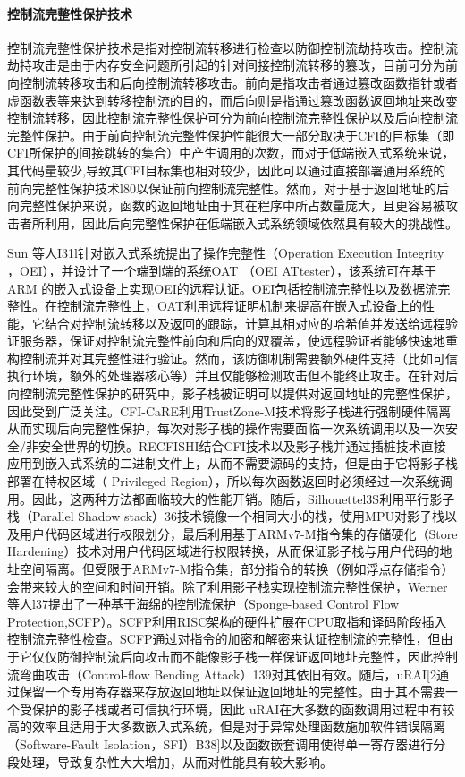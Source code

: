 \documentclass[12pt,a4paper]{ctexart}
\begin{document}
\paragraph{控制流完整性保护技术}
\par 控制流完整性保护技术是指对控制流转移进行检查以防御控制流劫持攻击。控制流劫持攻击是由于内存安全问题所引起的针对间接控制流转移的篡改，目前可分为前向控制流转移攻击和后向控制流转移攻击。前向是指攻击者通过篡改函数指针或者虚函数表等来达到转移控制流的目的，而后向则是指通过篡改函数返回地址来改变控制流转移，因此控制流完整性保护可分为前向控制流完整性保护以及后向控制流完整性保护。由于前向控制流完整性保护性能很大一部分取决于CFI的目标集（即CFI所保护的间接跳转的集合）中产生调用的次数，而对于低端嵌入式系统来说，其代码量较少,导致其CFI目标集也相对较少，因此可以通过直接部署通用系统的前向完整性保护技术l80以保证前向控制流完整性。然而，对于基于返回地址的后向完整性保护来说，函数的返回地址由于其在程序中所占数量庞大，且更容易被攻击者所利用，因此后向完整性保护在低端嵌入式系统领域依然具有较大的挑战性。
\par Sun 等人I31l针对嵌入式系统提出了操作完整性（Operation Execution Integrity ，OEI），并设计了一个端到端的系统OAT （OEI ATtester），该系统可在基于ARM 的嵌入式设备上实现OEI的远程认证。OEI包括控制流完整性以及数据流完整性。在控制流完整性上，OAT利用远程证明机制来提高在嵌入式设备上的性能，它结合对控制流转移以及返回的跟踪，计算其相对应的哈希值并发送给远程验证服务器，保证对控制流完整性前向和后向的双覆盖，使远程验证者能够快速地重构控制流并对其完整性进行验证。然而，该防御机制需要额外硬件支持（比如可信执行环境，额外的处理器核心等）并且仅能够检测攻击但不能终止攻击。在针对后向控制流完整性保护的研究中，影子栈被证明可以提供对返回地址的完整性保护，因此受到广泛关注。CFI-CaRE利用TrustZone-M技术将影子栈进行强制硬件隔离从而实现后向完整性保护，每次对影子栈的操作需要面临一次系统调用以及一次安全/非安全世界的切换。RECFISHI结合CFI技术以及影子栈并通过插桩技术直接应用到嵌入式系统的二进制文件上，从而不需要源码的支持，但是由于它将影子栈部署在特权区域（ Privileged Region），所以每次函数返回时必须经过一次系统调用。因此，这两种方法都面临较大的性能开销。随后，Silhouettel3S利用平行影子栈（Parallel Shadow stack）36技术镜像一个相同大小的栈，使用MPU对影子栈以及用户代码区域进行权限划分，最后利用基于ARMv7-M指令集的存储硬化（Store Hardening）技术对用户代码区域进行权限转换，从而保证影子栈与用户代码的地址空间隔离。但受限于ARMv7-M指令集，部分指令的转换（例如浮点存储指令）会带来较大的空间和时间开销。除了利用影子栈实现控制流完整性保护，Werner等人l37提出了一种基于海绵的控制流保护（Sponge-based Control Flow Protection,SCFP）。SCFP利用RISC架构的硬件扩展在CPU取指和译码阶段插入控制流完整性检查。SCFP通过对指令的加密和解密来认证控制流的完整性，但由于它仅仅防御控制流后向攻击而不能像影子栈一样保证返回地址完整性，因此控制流弯曲攻击（Control-flow Bending Attack）139对其依旧有效。随后，uRAI[2通过保留一个专用寄存器来存放返回地址以保证返回地址的完整性。由于其不需要一个受保护的影子栈或者可信执行环境，因此 uRAI在大多数的函数调用过程中有较高的效率且适用于大多数嵌入式系统，但是对于异常处理函数施加软件错误隔离（Software-Fault Isolation，SFI）B38]以及函数嵌套调用使得单一寄存器进行分段处理，导致复杂性大大增加，从而对性能具有较大影响。
\end{document}
